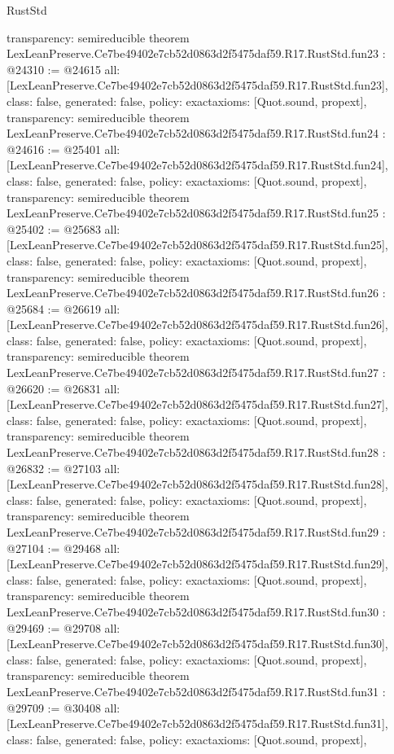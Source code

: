 \begin{lexlean}{RustStd}
\begin{coremodule}
{  transparency: semireducible
}
theorem LexLeanPreserve.Ce7be49402e7cb52d0863d2f5475daf59.R17.RustStd.fun23 : @24310 := @24615 {
  all: [LexLeanPreserve.Ce7be49402e7cb52d0863d2f5475daf59.R17.RustStd.fun23],
  class: false,
  generated: false,
  policy: exact{axioms: [Quot.sound, propext]},
  transparency: semireducible
}
theorem LexLeanPreserve.Ce7be49402e7cb52d0863d2f5475daf59.R17.RustStd.fun24 : @24616 := @25401 {
  all: [LexLeanPreserve.Ce7be49402e7cb52d0863d2f5475daf59.R17.RustStd.fun24],
  class: false,
  generated: false,
  policy: exact{axioms: [Quot.sound, propext]},
  transparency: semireducible
}
theorem LexLeanPreserve.Ce7be49402e7cb52d0863d2f5475daf59.R17.RustStd.fun25 : @25402 := @25683 {
  all: [LexLeanPreserve.Ce7be49402e7cb52d0863d2f5475daf59.R17.RustStd.fun25],
  class: false,
  generated: false,
  policy: exact{axioms: [Quot.sound, propext]},
  transparency: semireducible
}
theorem LexLeanPreserve.Ce7be49402e7cb52d0863d2f5475daf59.R17.RustStd.fun26 : @25684 := @26619 {
  all: [LexLeanPreserve.Ce7be49402e7cb52d0863d2f5475daf59.R17.RustStd.fun26],
  class: false,
  generated: false,
  policy: exact{axioms: [Quot.sound, propext]},
  transparency: semireducible
}
theorem LexLeanPreserve.Ce7be49402e7cb52d0863d2f5475daf59.R17.RustStd.fun27 : @26620 := @26831 {
  all: [LexLeanPreserve.Ce7be49402e7cb52d0863d2f5475daf59.R17.RustStd.fun27],
  class: false,
  generated: false,
  policy: exact{axioms: [Quot.sound, propext]},
  transparency: semireducible
}
theorem LexLeanPreserve.Ce7be49402e7cb52d0863d2f5475daf59.R17.RustStd.fun28 : @26832 := @27103 {
  all: [LexLeanPreserve.Ce7be49402e7cb52d0863d2f5475daf59.R17.RustStd.fun28],
  class: false,
  generated: false,
  policy: exact{axioms: [Quot.sound, propext]},
  transparency: semireducible
}
theorem LexLeanPreserve.Ce7be49402e7cb52d0863d2f5475daf59.R17.RustStd.fun29 : @27104 := @29468 {
  all: [LexLeanPreserve.Ce7be49402e7cb52d0863d2f5475daf59.R17.RustStd.fun29],
  class: false,
  generated: false,
  policy: exact{axioms: [Quot.sound, propext]},
  transparency: semireducible
}
theorem LexLeanPreserve.Ce7be49402e7cb52d0863d2f5475daf59.R17.RustStd.fun30 : @29469 := @29708 {
  all: [LexLeanPreserve.Ce7be49402e7cb52d0863d2f5475daf59.R17.RustStd.fun30],
  class: false,
  generated: false,
  policy: exact{axioms: [Quot.sound, propext]},
  transparency: semireducible
}
theorem LexLeanPreserve.Ce7be49402e7cb52d0863d2f5475daf59.R17.RustStd.fun31 : @29709 := @30408 {
  all: [LexLeanPreserve.Ce7be49402e7cb52d0863d2f5475daf59.R17.RustStd.fun31],
  class: false,
  generated: false,
  policy: exact{axioms: [Quot.sound, propext]},
}
\end{coremodule}
\end{lexlean}
